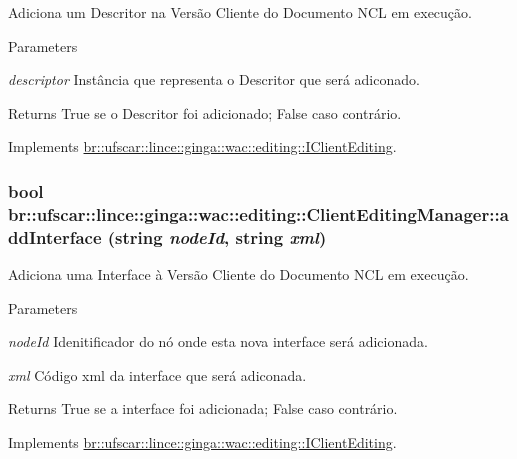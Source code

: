 Adiciona um Descritor na Versão Cliente do Documento NCL em execução. 


\begin{DoxyParams}{Parameters}
\item[{\em descriptor}]Instância que representa o Descritor que será adiconado. \end{DoxyParams}
\begin{DoxyReturn}{Returns}
True se o Descritor foi adicionado; False caso contrário. 
\end{DoxyReturn}


Implements \hyperlink{classbr_1_1ufscar_1_1lince_1_1ginga_1_1wac_1_1editing_1_1IClientEditing_a8fb8afeaa96087d789b6b0efd9571853}{br::ufscar::lince::ginga::wac::editing::IClientEditing}.

\hypertarget{classbr_1_1ufscar_1_1lince_1_1ginga_1_1wac_1_1editing_1_1ClientEditingManager_a1565a7f4347ad519fc405455c603fb3c}{
\subsubsection[{addInterface}]{\setlength{\rightskip}{0pt plus 5cm}bool br::ufscar::lince::ginga::wac::editing::ClientEditingManager::addInterface (string {\em nodeId}, \/  string {\em xml})}}
\label{classbr_1_1ufscar_1_1lince_1_1ginga_1_1wac_1_1editing_1_1ClientEditingManager_a1565a7f4347ad519fc405455c603fb3c}


Adiciona uma Interface à Versão Cliente do Documento NCL em execução. 


\begin{DoxyParams}{Parameters}
\item[{\em nodeId}]Idenitificador do nó onde esta nova interface será adicionada. \item[{\em xml}]Código xml da interface que será adiconada. \end{DoxyParams}
\begin{DoxyReturn}{Returns}
True se a interface foi adicionada; False caso contrário. 
\end{DoxyReturn}


Implements \hyperlink{classbr_1_1ufscar_1_1lince_1_1ginga_1_1wac_1_1editing_1_1IClientEditing_af60b6d775c412012b85a219311bbc4d8}{br::ufscar::lince::ginga::wac::editing::IClientEditing}.

